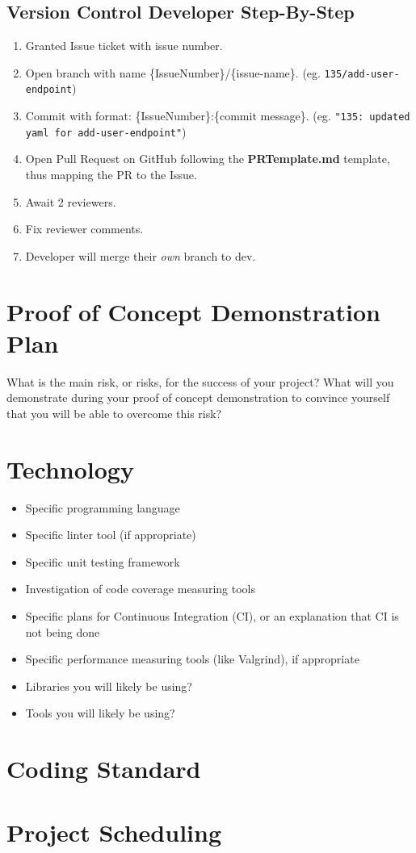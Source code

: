 \documentclass{article}
\def\code#1{\texttt{#1}}
\begin{document}
\subsection{Version Control Developer Step-By-Step}

\begin{enumerate}
	\item Granted Issue ticket with issue number.
	\item Open branch with name \{IssueNumber\}/\{issue-name\}. (eg. \code{135/add-user-endpoint})
	\item Commit with format: \{IssueNumber\}:\{commit message\}. (eg. \code{"135: updated yaml for add-user-endpoint"})
	\item Open Pull Request on GitHub following the \textbf{PRTemplate.md} template, thus mapping the PR to the Issue.
	\item Await 2 reviewers.
	\item Fix reviewer comments.
	\item Developer will merge their \emph{own} branch to dev.
\end{enumerate}

\section{Proof of Concept Demonstration Plan}

What is the main risk, or risks, for the success of your project?  What will you
demonstrate during your proof of concept demonstration to convince yourself that
you will be able to overcome this risk?

\section{Technology}

\begin{itemize}
\item Specific programming language
\item Specific linter tool (if appropriate)
\item Specific unit testing framework
\item Investigation of code coverage measuring tools
\item Specific plans for Continuous Integration (CI), or an explanation that CI
  is not being done
\item Specific performance measuring tools (like Valgrind), if
  appropriate
\item Libraries you will likely be using?
\item Tools you will likely be using?
\end{itemize}

\section{Coding Standard}

\section{Project Scheduling}

\end{document}
